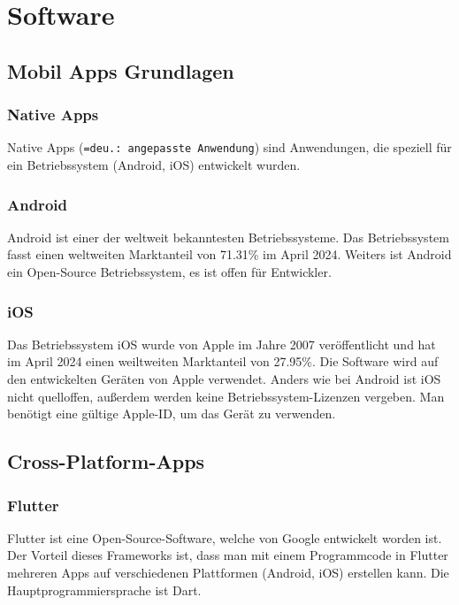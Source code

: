 \section{Software}


\subsection{Mobil Apps Grundlagen}

\subsubsection{Native Apps}

Native Apps (\texttt{=deu.: angepasste Anwendung}) sind Anwendungen, die speziell für ein Betriebssystem (Android, iOS) entwickelt wurden.

\subsubsection{Android}

Android ist einer der weltweit bekanntesten Betriebssysteme. Das Betriebssystem fasst einen weltweiten Marktanteil von 71.31\% im April 2024. \parencite{AndroidVsiOS} Weiters ist Android ein Open-Source Betriebssystem, es ist offen für Entwickler.  

\subsubsection{iOS}

Das Betriebssystem iOS wurde von Apple im Jahre 2007 veröffentlicht und hat im April 2024 einen weiltweiten Marktanteil von 27.95\%. \parencite{AndroidVsiOS} Die Software wird auf den entwickelten Geräten von Apple verwendet. Anders wie bei Android ist iOS nicht quelloffen, außerdem werden keine Betriebssystem-Lizenzen vergeben. Man benötigt eine gültige Apple-ID, um das Gerät zu verwenden.

\subsection{Cross-Platform-Apps}

\subsubsection{Flutter}

Flutter ist eine Open-Source-Software, welche von Google entwickelt worden ist.\textcite{Flutter} Der Vorteil dieses Frameworks ist, dass man mit einem Programmcode in Flutter mehreren Apps auf verschiedenen Plattformen (Android, iOS) erstellen kann. Die Hauptprogrammiersprache ist Dart.


